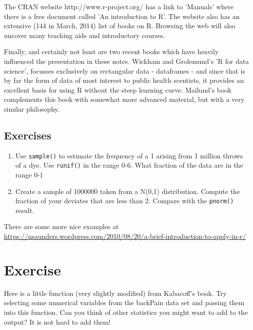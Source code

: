 \documentclass[titlepage]{book}\usepackage{knitr}
\begin{document}
The CRAN website http://www.r-project.org/ has a link to 'Manuals' where there is a free document called 'An introduction to R'. The website also has an extensive (144 in March, 2014) list of books on R. Browsing the web will also uncover many teaching aids and introductory courses.

Finally, and certainly not least are two recent books which have heavily influenced the presentation in these notes. Wickham and Grolemund's 'R for data science'\cite{Wickham2017}, focusses exclusively on rectangular data - dataframes - and since that is by far the form of data of most interest to public health scentists, it provides an excellent basis for using R without the steep learning curve.
Mailund's book \cite{Mailund2017} complements this book with somewhat more advanced material, but with a very similar philosophy.

\subsection{Exercises}
\begin{enumerate}

\item Use \texttt{sample()} to estimate the frequency of a 1 arising from 1 million throws of a dye. 
Use \texttt{runif()} in the range 0-6. What fraction of the data are in the range 0-1

\item Create a sample of 1000000 taken from a N(0,1) distribution.
Compute the fraction of your deviates that are less than 2. Compare with the \texttt{pnorm()} result.
\end{enumerate}


There are some more nice examples at \href{https://nsaunders.wordpress.com/2010/08/20/a-brief-introduction-to-apply-in-r/}{https://nsaunders.wordpress.com/2010/08/20/a-brief-introduction-to-apply-in-r/}

\section{Exercise}

Here is a little function (very slightly modified) from Kabacoff's book\cite{Kabacoff2015}.
Try selecting some numerical variables from the backPain data set and passing them into this function.
Can you think of other statistics you might want to add to the output? It is not hard to add them!
\end{document}

